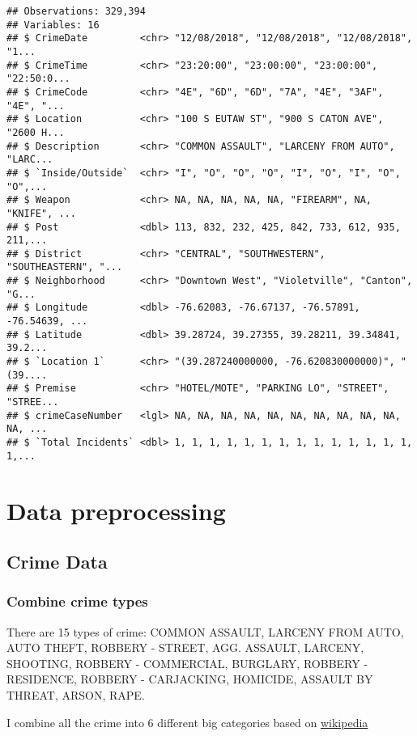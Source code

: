 \documentclass[]{article}
\begin{document}
\begin{verbatim}
## Observations: 329,394
## Variables: 16
## $ CrimeDate         <chr> "12/08/2018", "12/08/2018", "12/08/2018", "1...
## $ CrimeTime         <chr> "23:20:00", "23:00:00", "23:00:00", "22:50:0...
## $ CrimeCode         <chr> "4E", "6D", "6D", "7A", "4E", "3AF", "4E", "...
## $ Location          <chr> "100 S EUTAW ST", "900 S CATON AVE", "2600 H...
## $ Description       <chr> "COMMON ASSAULT", "LARCENY FROM AUTO", "LARC...
## $ `Inside/Outside`  <chr> "I", "O", "O", "O", "I", "O", "I", "O", "O",...
## $ Weapon            <chr> NA, NA, NA, NA, NA, "FIREARM", NA, "KNIFE", ...
## $ Post              <dbl> 113, 832, 232, 425, 842, 733, 612, 935, 211,...
## $ District          <chr> "CENTRAL", "SOUTHWESTERN", "SOUTHEASTERN", "...
## $ Neighborhood      <chr> "Downtown West", "Violetville", "Canton", "G...
## $ Longitude         <dbl> -76.62083, -76.67137, -76.57891, -76.54639, ...
## $ Latitude          <dbl> 39.28724, 39.27355, 39.28211, 39.34841, 39.2...
## $ `Location 1`      <chr> "(39.287240000000, -76.620830000000)", "(39....
## $ Premise           <chr> "HOTEL/MOTE", "PARKING LO", "STREET", "STREE...
## $ crimeCaseNumber   <lgl> NA, NA, NA, NA, NA, NA, NA, NA, NA, NA, NA, ...
## $ `Total Incidents` <dbl> 1, 1, 1, 1, 1, 1, 1, 1, 1, 1, 1, 1, 1, 1, 1,...
\end{verbatim}

\section{Data preprocessing}\label{data-preprocessing}

\subsection{Crime Data}\label{crime-data-1}

\subsubsection{Combine crime types}\label{combine-crime-types}

There are 15 types of crime: COMMON ASSAULT, LARCENY FROM AUTO, AUTO
THEFT, ROBBERY - STREET, AGG. ASSAULT, LARCENY, SHOOTING, ROBBERY -
COMMERCIAL, BURGLARY, ROBBERY - RESIDENCE, ROBBERY - CARJACKING,
HOMICIDE, ASSAULT BY THREAT, ARSON, RAPE.

I combine all the crime into 6 different big categories based on
\href{https://en.wikipedia.org/wiki/Crime}{wikipedia}
\end{document}
